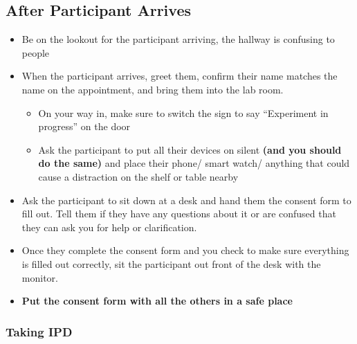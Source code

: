\documentclass[
]{article}
\providecommand{\tightlist}{%
  \setlength{\itemsep}{0pt}\setlength{\parskip}{0pt}}
\begin{document}
\hypertarget{after-participant-arrives}{%
\subsection{After Participant Arrives}\label{after-participant-arrives}}

\begin{itemize}
\tightlist
\item
  Be on the lookout for the participant arriving, the hallway is
  confusing to people
\item
  When the participant arrives, greet them, confirm their name matches
  the name on the appointment, and bring them into the lab room.

  \begin{itemize}
  \tightlist
  \item
    On your way in, make sure to switch the sign to say ``Experiment in
    progress'' on the door
  \item
    Ask the participant to put all their devices on silent \textbf{(and
    you should do the same)} and place their phone/ smart watch/
    anything that could cause a distraction on the shelf or table nearby
  \end{itemize}
\item
  Ask the participant to sit down at a desk and hand them the consent
  form to fill out. Tell them if they have any questions about it or are
  confused that they can ask you for help or clarification.
\item
  Once they complete the consent form and you check to make sure
  everything is filled out correctly, sit the participant out front of
  the desk with the monitor.
\item
  \textbf{Put the consent form with all the others in a safe place}
\end{itemize}

\hypertarget{taking-ipd}{%
\subsubsection{Taking IPD}\label{taking-ipd}}
\end{document}
